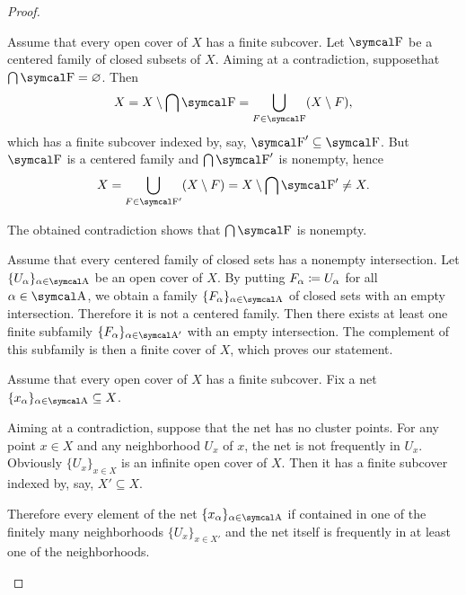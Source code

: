 \begin{proof}
  \begin{description}
     Assume that every open cover of \( X \) has a finite subcover. Let \( \CF \) be a centered family of closed subsets of \( X \). Aiming at a contradiction, suppose\LEM that \( \bigcap \CF = \varnothing \). Then
    \begin{equation*}
      X
      =
      X \setminus \bigcap \CF
      =
      \bigcup_{F \in \CF} (X \setminus F),
    \end{equation*}
    which has a finite subcover indexed by, say, \( \CF' \subseteq \CF \). But \( \CF \) is a centered family and \( \bigcap \CF' \) is nonempty, hence
    \begin{equation*}
      X
      =
      \bigcup_{F \in \CF'} (X \setminus F)
      =
      X \setminus \bigcap \CF'
      \neq
      X.
    \end{equation*}

    The obtained contradiction shows that \( \bigcap \CF \) is nonempty.

     Assume that every centered family of closed sets has a nonempty intersection. Let \( \{ U_\al \}_{\al \in \CA} \) be an open cover of \( X \). By putting \( F_\alpha \coloneqq U_\alpha \) for all \( \al \in \CA \), we obtain a family \( \{ F_\al \}_{\al \in \CA} \) of closed sets with an empty intersection. Therefore it is not a centered family. Then there exists at least one finite subfamily \( \{ F_\al \}_{\al \in \CA'} \) with an empty intersection. The complement of this subfamily is then a finite cover of \( X \), which proves our statement.

     Assume that every open cover of \( X \) has a finite subcover. Fix a net \( \{ x_\al \}_{\al \in \CA} \subseteq X \).

    Aiming at a contradiction, suppose that the net has no cluster points. For any point \( x \in X \) and any neighborhood \( U_x \) of \( x \), the net is not frequently in \( U_x \). Obviously \( \{ U_x \}_{x \in X} \) is an infinite open cover of \( X \). Then it has a finite subcover indexed by, say, \( X' \subseteq X \).

    Therefore every element of the net \( \{ x_\al \}_{\al \in \CA} \) if contained in one of the finitely many neighborhoods \( \{ U_x \}_{x \in X'} \) and the net itself is frequently in at least one of the neighborhoods.


\end{description}
\end{proof}
